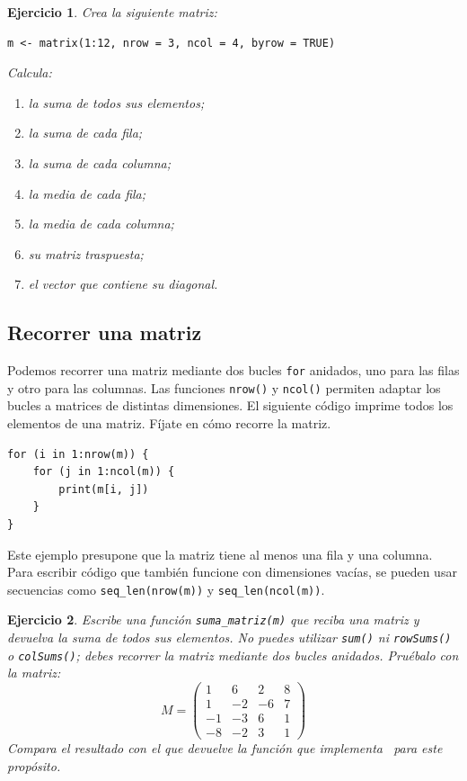 \documentclass[11pt,a4paper]{article}
\newcommand{\R}{\textcolor{azuluc}{\faIcon{r-project}}}
\theoremstyle{exercise}
\newtheorem{exercise}{Ejercicio}
\begin{document}
\begin{exercise}
Crea la siguiente matriz:

\begin{lstlisting}[style=rstyle]
m <- matrix(1:12, nrow = 3, ncol = 4, byrow = TRUE)
\end{lstlisting}
Calcula:
\begin{enumerate}
    \item[a)] la suma de todos sus elementos;
    \item[b)] la suma de cada fila;
    \item[c)] la suma de cada columna;
    \item[d)] la media de cada fila;
    \item[e)] la media de cada columna;
    \item[f)] su matriz traspuesta;
    \item[g)] el vector que contiene su diagonal.
\end{enumerate}
\end{exercise}

\subsection{Recorrer una matriz}

Podemos recorrer una matriz mediante dos bucles \texttt{for} anidados, uno para las filas y otro para las columnas. Las funciones \texttt{nrow()} y \texttt{ncol()} permiten adaptar los bucles a matrices de distintas dimensiones. El siguiente código imprime todos los elementos de una matriz. Fíjate en cómo recorre la matriz.

\begin{lstlisting}[style=rstyle]
for (i in 1:nrow(m)) {
    for (j in 1:ncol(m)) {
        print(m[i, j])
    }
}
\end{lstlisting}

Este ejemplo presupone que la matriz tiene al menos una fila y una columna. Para escribir código que también funcione con dimensiones vacías, se pueden usar secuencias como \texttt{seq\_len(nrow(m))} y \texttt{seq\_len(ncol(m))}.

\begin{exercise}
Escribe una función \texttt{suma\_matriz(m)} que reciba una matriz y devuelva la suma de todos sus elementos. No puedes utilizar \texttt{sum()} ni \texttt{rowSums()} o \texttt{colSums()}; debes recorrer la matriz mediante dos bucles anidados. Pruébalo con la matriz:
\[
M = 
\left( 
	\begin{array}{rrrr}
		 1 &  6 &  2 & 8 \\
		 1 & -2 & -6 & 7 \\
		-1 & -3 &  6 & 1 \\
		-8 & -2 &  3 & 1
	\end{array}
\right)
\]
Compara el resultado con el que devuelve la función que implementa \R\ para este propósito.
\end{exercise}
\end{document}
